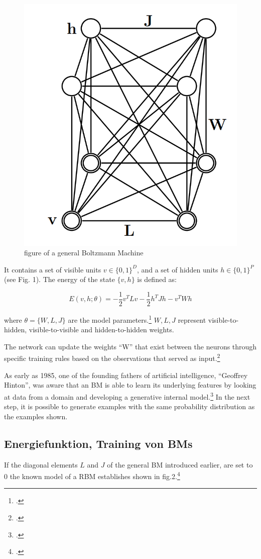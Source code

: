 \begin{figure}[H]
    \centering
    \includegraphics[width=0.25\linewidth]{graphics/General_BM.png}
    \caption{figure of a general Boltzmann Machine}
    \label{fig1}
\end{figure}
It contains a set of visible units \( v \in \{0, 1\}^D \), and a set of hidden units \( h \in \{0, 1\}^P \) (see Fig. 1). The energy of the state \( \{v, h\} \) is defined as:

\begin{equation}
E(v, h; \theta) = -\frac{1}{2} v^T L v - \frac{1}{2} h^T J h - v^T W h
\end{equation}

where \( \theta = \{W, L, J\} \) are the model parameters.\footcite[448][Vgl.]{salakhutdinovDeepBoltzmannMachines2009}
\( W, L, J \) represent visible-to-hidden, visible-to-visible and hidden-to-hidden weights.
 

The network can update the weights ``W'' that exist between the neurons through specific training rules based on the observations that served as input.\footcite[Vgl.][1-2]{barraEquivalenceHopfieldNetworks2012}

As early as 1985, one of the founding fathers of artificial intelligence, ``Geoffrey Hinton'', was aware that an \ac{BM} is able to learn its underlying features by looking at data from a domain and developing a generative internal model.\footcite[Vgl.][148]{ackleyLearningAlgorithmBoltzmann1985}
In the next step, it is possible to generate examples with the same probability distribution as the examples shown.


\subsection{Energiefunktion, Training von BMs}


If the diagonal elements \( L \) and \( J \) of the general \ac{BM} introduced earlier, are set to 0 the known model of a \ac{RBM} establishes shown in fig.2.\footcite[Vgl.][449]{salakhutdinovDeepBoltzmannMachines2009}

